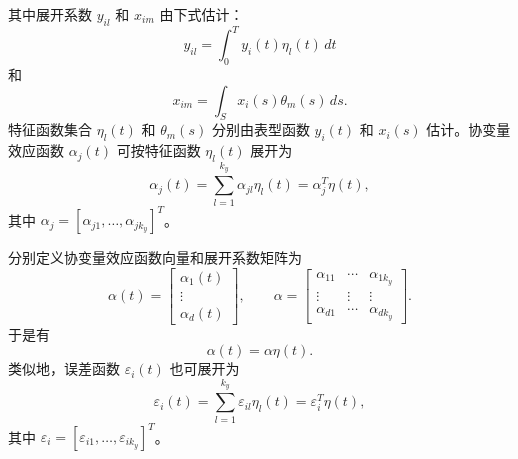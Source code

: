 其中展开系数 $y_{il}$ 和 $x_{im}$ 由下式估计：
\begin{equation}
y_{il}=\int_0^T y_i(t)\eta_l(t)\,dt
\tag{3.47}
\end{equation}
和
\begin{equation}
x_{im}=\int_S x_i(s)\theta_m(s)\,ds.
\tag{3.48}
\end{equation}
特征函数集合 $\eta_l(t)$ 和 $\theta_m(s)$ 分别由表型函数 $y_i(t)$ 和 $x_i(s)$ 估计。协变量效应函数 $\alpha_j(t)$ 可按特征函数 $\eta_l(t)$ 展开为
\begin{equation}
\alpha_j(t)=\sum_{l=1}^{k_y}\alpha_{jl}\eta_l(t)=\alpha_j^T\eta(t),
\tag{3.49}
\end{equation}
其中 $\alpha_j=[\alpha_{j1},\ldots,\alpha_{jk_y}]^T$。

分别定义协变量效应函数向量和展开系数矩阵为
\[
\alpha(t)=\begin{bmatrix}\alpha_1(t)\\\vdots\\\alpha_d(t)\end{bmatrix},
\qquad
\alpha=\begin{bmatrix}
\alpha_{11}&\cdots&\alpha_{1k_y}\\
\vdots&\vdots&\vdots\\
\alpha_{d1}&\cdots&\alpha_{dk_y}
\end{bmatrix}.
\]
于是有
\begin{equation}
\alpha(t)=\alpha\eta(t).
\tag{3.50}
\end{equation}
类似地，误差函数 $\varepsilon_i(t)$ 也可展开为
\begin{equation}
\varepsilon_i(t)=\sum_{l=1}^{k_y}\varepsilon_{il}\eta_l(t)
=\varepsilon_i^T\eta(t),
\tag{3.51}
\end{equation}
其中 $\varepsilon_i=[\varepsilon_{i1},\ldots,\varepsilon_{ik_y}]^T$。

